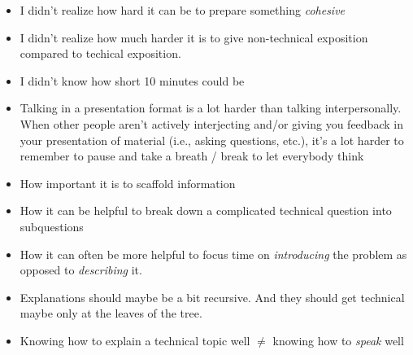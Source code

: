 \documentclass{fkpset}
\begin{document}
\begin{solution}[Response.]
\begin{multicols}{2}
\begin{itemize}
    \item I didn't realize how hard it can be to prepare something
      \emph{cohesive}
    \item I didn't realize how much harder it is to give non-technical
      exposition compared to techical exposition.
    \item I didn't know how short 10 minutes could be
    \item Talking in a presentation format is a lot harder than
      talking interpersonally. When other people aren't actively
      interjecting and/or giving you feedback in your presentation of
      material (i.e., asking questions, etc.), it's a lot harder to
      remember to pause and take a breath / break to let everybody
      think
    \item How important it is to scaffold information
    \item How it can be helpful to break down a complicated technical
      question into subquestions
    \item How it can often be more helpful to focus time on
      \emph{introducing} the problem as opposed to \emph{describing}
      it.
    \item Explanations should maybe be a bit recursive. And they
      should get technical maybe only at the leaves of the tree.
    \item Knowing how to explain a technical topic well $\neq$ knowing
      how to \emph{speak} well
  \end{itemize}
  \end{multicols}





\end{solution}
\end{document}
